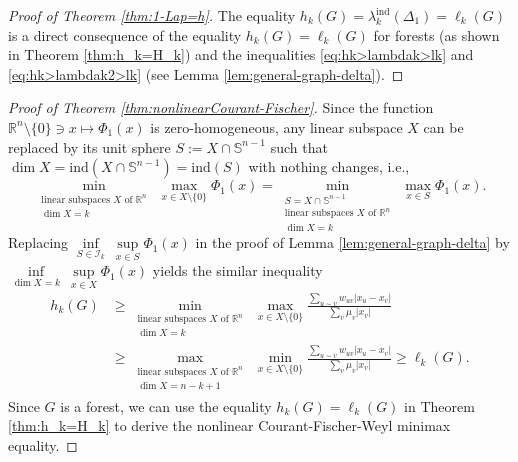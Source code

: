 \documentclass[12pt, reqno]{article}
\begin{document}
\begin{proof}[Proof of Theorem \ref{thm:1-Lap=h}]
The equality $h_k(G)=\lambda_k^{\mathrm{ind}}(\Delta_1)=\ell_k(G)$ is a direct consequence of the equality $h_k(G)=\ell_k(G)$ for forests (as shown in Theorem \ref{thm:h_k=H_k}) and the inequalities \eqref{eq:hk>lambdak>lk} and \eqref{eq:hk>lambdak2>lk} (see Lemma \ref{lem:general-graph-delta}). 
\end{proof}

\begin{proof}[Proof of Theorem \ref{thm:nonlinearCourant-Fischer}]
Since the function $\mathbb{R}^n\setminus\{0\}\ni x\mapsto \Phi_1(x)$ is zero-homogeneous, any linear subspace $X$ can be replaced by its unit sphere $S:=X\cap \mathbb{S}^{n-1}$ such that $\dim X=\mathrm{ind}(X\cap \mathbb{S}^{n-1})=\mathrm{ind}(S)$ with nothing changes, i.e., 
$$\min_{\substack{\text{linear subspaces }X\text{ of }\mathbb R^n\\\dim X=k}}~\max_{x\in X\setminus\{0\}} \Phi_1(x)=\min_{\substack{S=X\cap \mathbb{S}^{n-1}\\\text{linear subspaces }X\text{ of }\mathbb R^n\\\dim X= k}}~\max_{x\in S}\Phi_1(x) .$$
Replacing $\inf\limits_{S\in\mathcal{I}_k}~\sup\limits_{x\in S}\Phi_1(x)$ in the proof of Lemma \ref{lem:general-graph-delta} by $\inf\limits_{\dim X=k}~\sup\limits_{x\in X}\Phi_1(x)$ yields the similar inequality
\begin{align*}h_k(G)&\ge\min\limits_{\substack{\text{linear subspaces }X\text{ of }\mathbb R^n\\\dim X= k}}~\max\limits_{x\in X\setminus\{0\}} \frac{\sum\limits_{u\sim v}w_{uv}|x_u-x_v|}{\sum\limits_v\mu_v|x_v|}\\&\ge \max\limits_{\substack{\text{linear subspaces }X\text{ of }\mathbb R^n\\\dim X= n-k+1}}~\min\limits_{x\in X\setminus\{0\}} \frac{\sum\limits_{u\sim v}w_{uv}|x_u-x_v|}{\sum\limits_v\mu_v|x_v|}
\ge \ell_k(G) .\end{align*}
Since $G$ is a forest, we can use the equality $h_k(G)=\ell_k(G)$ in Theorem \ref{thm:h_k=H_k} to derive the nonlinear Courant-Fischer-Weyl minimax equality. 
\end{proof}
\end{document}
